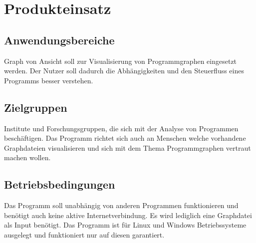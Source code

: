 \chapter{Produkteinsatz}

\section{Anwendungsbereiche}
Graph von Ansicht soll zur Visualisierung von Programmgraphen eingesetzt werden. Der Nutzer soll dadurch die Abhängigkeiten und den Steuerfluss eines Programms besser verstehen.
\section{Zielgruppen}
Institute und Forschungsgruppen, die sich mit der Analyse von Programmen beschäftigen. Das Programm richtet sich auch an Menschen welche vorhandene Graphdateien visualisieren und sich mit dem Thema Programmgraphen vertraut machen wollen.

\section{Betriebsbedingungen}
Das Programm soll unabhängig von anderen Programmen funktionieren und benötigt auch keine aktive Internetverbindung. Es wird lediglich eine Graphdatei als Input benötigt. Das Programm ist für Linux und Windows Betriebssysteme ausgelegt und funktioniert nur auf diesen garantiert.

